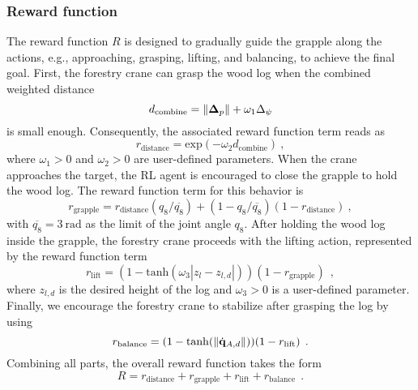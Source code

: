 \subsubsection{Reward function}    
The reward function $R$ is designed to gradually guide the grapple along the actions, e.g., approaching, grasping, lifting, and balancing, to achieve the final goal. 
First, the forestry crane can grasp the wood log when the combined weighted distance 
\begin{equation}
    d_\mathrm{combine} = \left\lVert\bm{\Delta}_p\right\rVert + \omega_1 \Delta_\psi
    \label{eq: d combine}
\end{equation}
is small enough. Consequently, the associated reward function term reads as
\begin{equation}
    r_{\mathrm{distance}}  = \mathrm{exp}(-\omega_2 d_\mathrm{combine}) \:,
    \label{eq: r_distance}
\end{equation}
where $\omega_1 > 0 $ and $\omega_2 > 0$ are user-defined parameters. 
When the crane approaches the target, the RL agent is encouraged to close the grapple to hold the wood log. The reward function term for this behavior is
\begin{equation}
    r_{\mathrm{grapple}}  = r_{\mathrm{distance}}({q_{8}}/{\overline{q_8}}) + (1-{q_{8}}/{\overline{q_8}})(1-r_{\mathrm{distance}})\:,
\end{equation}
with $\overline{q_8} = \SI{3}{\radian}$ as the limit of the joint angle $q_8$. 
After holding the wood log inside the grapple, the forestry crane proceeds with the lifting action, represented by the reward function term%
\begin{equation}
    r_{\mathrm{lift}} = (1- \mathrm{tanh}(\omega_3|z_l-z_{l,d}|))(1-r_\mathrm{grapple})\:\:,
\end{equation}
where $z_{l,d}$ is the desired height of the log and $\omega_3 >0$ is a user-defined parameter. Finally, we encourage the forestry crane to stabilize after grasping the log by using
\begin{equation}
    r_{\mathrm{balance}} = (1 - \mathrm{tanh}(\left\lVert\dot{\mathbf{q}}_{A,d}\right\rVert))(1-r_\mathrm{lift}) \:\:.
\end{equation}
Combining all parts, the overall reward function takes the form
\begin{equation}
    R = r_{\mathrm{distance}} + r_{\mathrm{grapple}} + r_{\mathrm{lift}} + r_{\mathrm{balance}} \:\:.
\end{equation}

